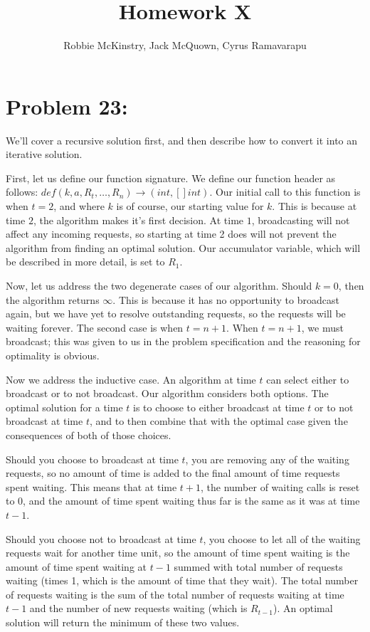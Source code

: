 \documentclass[12pt]{article}
\begin{document}
\title{Homework X}
\author{Robbie McKinstry, Jack McQuown, Cyrus Ramavarapu}
\renewcommand{\today}{27 September 2016}
\renewcommand{\baselinestretch}{1.5}
\maketitle

\section*{Problem 23:}

We'll cover a recursive solution first, and then describe how to convert it into an iterative solution.

First, let us define our function signature. We define our function header as follows: $def(k, a, R_{t}, \dots, R_{n}) \rightarrow (int, []int)$. Our initial call to this function is when $t=2$, and where $k$ is of course, our starting value for $k$. This is because at time $2$, the algorithm makes it's first decision. At time $1$, broadcasting will not affect any incoming requests, so starting at time 2 does will not prevent the algorithm from finding an optimal solution. Our accumulator variable, which will be described in more detail, is set to $R_{1}$.

Now, let us address the two degenerate cases of our algorithm. Should $k=0$, then the algorithm returns $\infty$. This is because it has no opportunity to broadcast again, but we have yet to resolve outstanding requests, so the requests will be waiting forever. The second case is when $t=n+1$. When $t=n+1$, we must broadcast; this was given to us in the problem specification and the reasoning for optimality is obvious. 

Now we address the inductive case. An algorithm at time $t$ can select either to broadcast or to not broadcast. Our algorithm considers both options. The optimal solution for a time $t$ is to choose to either broadcast at time $t$ or to not broadcast at time $t$, and to then combine that with the optimal case given the consequences of both of those choices.

Should you choose to broadcast at time $t$, you are removing any of the waiting requests, so no amount of time is added to the final amount of time requests spent waiting. This means that at time $t+1$, the number of waiting calls is reset to 0, and the amount of time spent waiting thus far is the same as it was at time $t-1$.

Should you choose not to broadcast at time $t$, you choose to let all of the waiting requests wait for another time unit, so the amount of time spent waiting is the amount of time spent waiting at $t-1$ summed with total number of requests waiting (times 1, which is the amount of time that they wait). The total number of requests waiting is the sum of the total number of requests waiting at time $t-1$ and the number of new requests waiting (which is $R_{t-1}$). An optimal solution will return the minimum of these two values.
\end{document}
